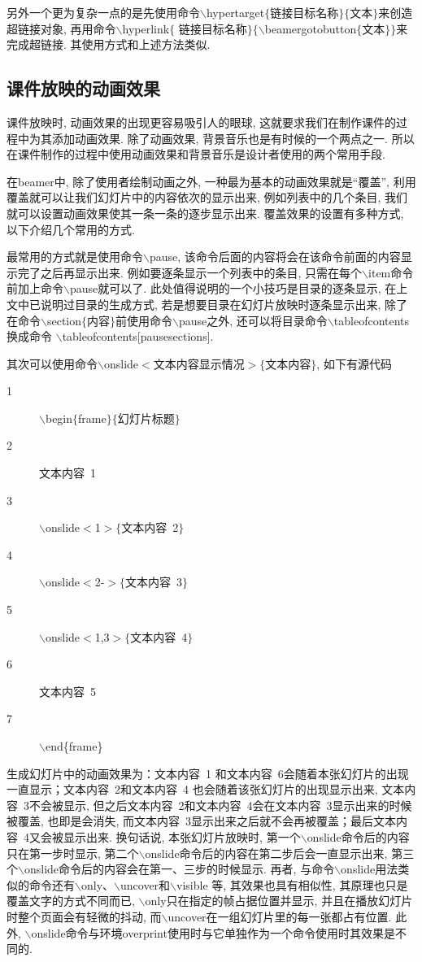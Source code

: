另外一个更为复杂一点的是先使用命令$\backslash$hypertarget$\{$链接目标名称$\}\{$文本$\}$来创造超链接对象, 再用命令$\backslash$hyperlink$\{$ 链接目标名称$\}\{\backslash$beamergotobutton$\{$文本$\}\}$来完成超链接. 其使用方式和上述方法类似.

\subsection{课件放映的动画效果}

课件放映时, 动画效果的出现更容易吸引人的眼球, 这就要求我们在制作课件的过程中为其添加动画效果. 除了动画效果, 背景音乐也是有时候的一个两点之一. 所以在课件制作的过程中使用动画效果和背景音乐是设计者使用的两个常用手段.


在beamer中, 除了使用者绘制动画之外, 一种最为基本的动画效果就是“覆盖”, 利用覆盖就可以让我们幻灯片中的内容依次的显示出来, 例如列表中的几个条目, 我们就可以设置动画效果使其一条一条的逐步显示出来. 覆盖效果的设置有多种方式, 以下介绍几个常用的方式.


最常用的方式就是使用命令$\backslash$pause, 该命令后面的内容将会在该命令前面的内容显示完了之后再显示出来. 例如要逐条显示一个列表中的条目, 只需在每个$\backslash$item命令前加上命令$\backslash$pause就可以了. 此处值得说明的一个小技巧是目录的逐条显示, 在上文中已说明过目录的生成方式, 若是想要目录在幻灯片放映时逐条显示出来, 除了在命令$\backslash$section$\{$内容$\}$前使用命令$\backslash$pause之外, 还可以将目录命令$\backslash$tableofcontents换成命令	$\backslash$tableofcontents[pausesections].


其次可以使用命令$\backslash$onslide$<$文本内容显示情况$>\{$文本内容$\}$, 如下有源代码
\begin{description}
  \item[1]$\backslash$begin$\{$frame$\}\{$幻灯片标题$\}$
  \item[2] 文本内容~1
  \item[3]$\backslash$onslide$<$1$>\{$文本内容~2$\}$
  \item[4]$\backslash$onslide$<$2-$>\{$文本内容~3$\}$
  \item[5]$\backslash$onslide$<$1,3$>\{$文本内容~4$\}$
  \item[6] 文本内容~5
  \item[7]$\backslash$end\{frame\}
\end{description}
生成幻灯片中的动画效果为：文本内容~1 和文本内容~6会随着本张幻灯片的出现一直显示；文本内容~2和文本内容~4 也会随着该张幻灯片的出现显示出来, 文本内容~3不会被显示, 但之后文本内容~2和文本内容~4会在文本内容~3显示出来的时候被覆盖, 也即是会消失, 而文本内容~3显示出来之后就不会再被覆盖；最后文本内容~4又会被显示出来. 换句话说, 本张幻灯片放映时, 第一个$\backslash$onslide命令后的内容只在第一步时显示, 第二个$\backslash$onslide命令后的内容在第二步后会一直显示出来, 第三个$\backslash$onslide命令后的内容会在第一、三步的时候显示. 再者, 与命令$\backslash$onslide用法类似的命令还有$\backslash$only、$\backslash$uncover和$\backslash$visible 等, 其效果也具有相似性, 其原理也只是覆盖文字的方式不同而已, $\backslash$only只在指定的帧占据位置并显示, 并且在播放幻灯片时整个页面会有轻微的抖动, 而$\backslash$uncover在一组幻灯片里的每一张都占有位置. 此外, $\backslash$onslide命令与环境overprint使用时与它单独作为一个命令使用时其效果是不同的.


